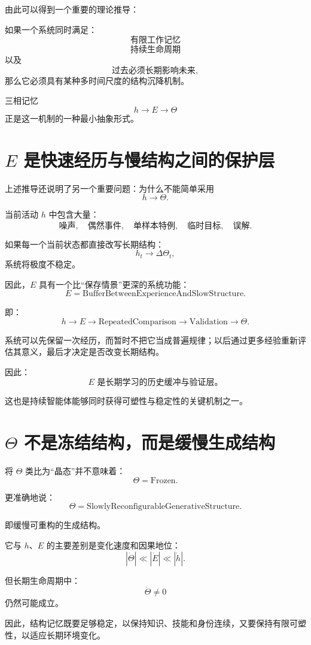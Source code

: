 由此可以得到一个重要的理论推导：

如果一个系统同时满足：
\[
\boxed{
\text{有限工作记忆}
}
\]
\[
\boxed{
\text{持续生命周期}
}
\]
以及
\[
\boxed{
\text{过去必须长期影响未来},
}
\]
那么它必须具有某种多时间尺度的结构沉降机制。

三相记忆
\[
h\rightarrow E\rightarrow\Theta
\]
正是这一机制的一种最小抽象形式。

\section{$E$ 是快速经历与慢结构之间的保护层}

上述推导还说明了另一个重要问题：为什么不能简单采用
\[
h\rightarrow\Theta.
\]

当前活动 $h$ 中包含大量：
\[
\text{噪声},
\quad
\text{偶然事件},
\quad
\text{单样本特例},
\quad
\text{临时目标},
\quad
\text{误解}.
\]

如果每一个当前状态都直接改写长期结构：
\[
h_t\rightarrow\Delta\Theta_t,
\]
系统将极度不稳定。

因此，$E$ 具有一个比“保存情景”更深的系统功能：
\[
\boxed{
E=
\text{BufferBetweenExperienceAndSlowStructure}.
}
\]

即：
\[
\boxed{
h
\rightarrow
E
\rightarrow
\text{RepeatedComparison}
\rightarrow
\text{Validation}
\rightarrow
\Theta.
}
\]

系统可以先保留一次经历，而暂时不把它当成普遍规律；以后通过更多经验重新评估其意义，最后才决定是否改变长期结构。

因此：
\[
\boxed{
E
\text{ 是长期学习的历史缓冲与验证层。}
}
\]

这也是持续智能体能够同时获得可塑性与稳定性的关键机制之一。

\section{$\Theta$ 不是冻结结构，而是缓慢生成结构}

将 $\Theta$ 类比为“晶态”并不意味着：
\[
\Theta=\text{Frozen}.
\]

更准确地说：
\[
\boxed{
\Theta=
\text{SlowlyReconfigurableGenerativeStructure}.
}
\]

即缓慢可重构的生成结构。

它与 $h$、$E$ 的主要差别是变化速度和因果地位：
\[
|\dot\Theta|
\ll
|\dot E|
\ll
|\dot h|.
\]

但长期生命周期中：
\[
\dot\Theta\neq0
\]
仍然可能成立。

因此，结构记忆既要足够稳定，以保持知识、技能和身份连续，又要保持有限可塑性，以适应长期环境变化。

